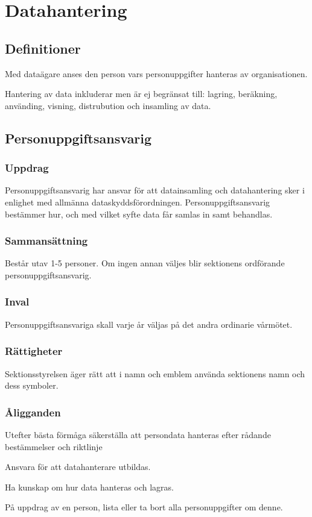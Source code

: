 \section{Datahantering}

\subsection{Definitioner}
	    
	    Med dataägare anses den person vars personuppgifter hanteras av organisationen.
	    
	    Hantering av data inkluderar men är ej begränsat till: lagring, beräkning, använding, visning, distrubution och insamling av data.

\subsection{Personuppgiftsansvarig}

\subsubsection{ Uppdrag}
Personuppgiftsansvarig har ansvar för att datainsamling och datahantering sker i enlighet med allmänna dataskyddsförordningen.  Personuppgiftsansvarig bestämmer hur, och med vilket syfte data får samlas in samt behandlas.

\subsubsection{ Sammansättning}
Består utav 1-5 personer. Om ingen annan väljes blir sektionens ordförande personuppgiftsansvarig.

\subsubsection{ Inval}
Personuppgiftsansvariga skall varje år väljas på det andra ordinarie vårmötet.

\subsubsection{ Rättigheter}
Sektionsstyrelsen äger rätt att i namn och emblem använda sektionens namn och dess symboler.

\subsubsection{Åligganden}
\begin{att}
    \item Utefter bästa förmåga säkerställa att persondata hanteras efter rådande bestämmelser och riktlinje
    \item Ansvara för att datahanterare utbildas.
    \item Ha kunskap om hur data hanteras och lagras.
    \item På uppdrag av en person, lista eller ta bort alla personuppgifter om denne.
\end{att}

